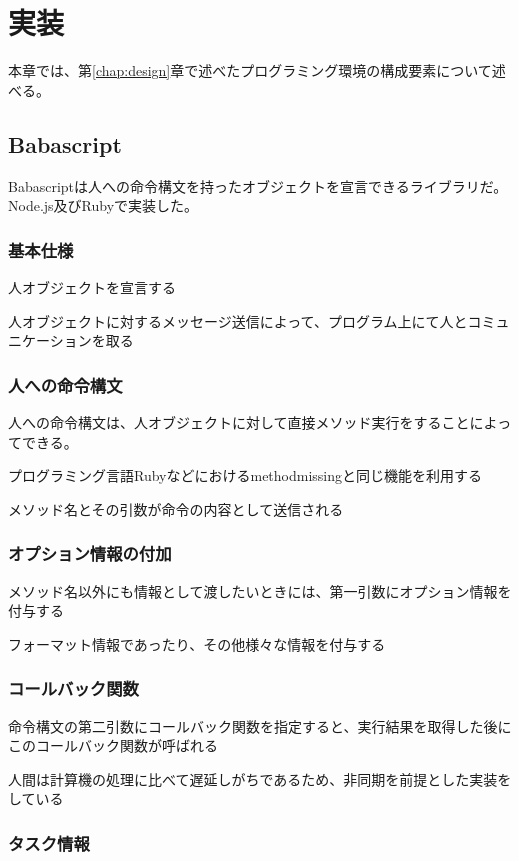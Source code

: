 \chapter{実装}
\label{chap:implementation}

本章では、第\ref{chap:design}章で述べたプログラミング環境の構成要素について述べる。

\section{Babascript}

Babascriptは人への命令構文を持ったオブジェクトを宣言できるライブラリだ。
Node.js及びRubyで実装した。


\subsection{基本仕様}
人オブジェクトを宣言する

人オブジェクトに対するメッセージ送信によって、プログラム上にて人とコミュニケーションを取る

\subsection{人への命令構文}
人への命令構文は、人オブジェクトに対して直接メソッド実行をすることによってできる。

プログラミング言語Rubyなどにおけるmethodmissingと同じ機能を利用する

メソッド名とその引数が命令の内容として送信される

\subsection{オプション情報の付加}

メソッド名以外にも情報として渡したいときには、第一引数にオプション情報を付与する

フォーマット情報であったり、その他様々な情報を付与する

\subsection{コールバック関数}

命令構文の第二引数にコールバック関数を指定すると、実行結果を取得した後にこのコールバック関数が呼ばれる

人間は計算機の処理に比べて遅延しがちであるため、非同期を前提とした実装をしている

\subsection{タスク情報}


